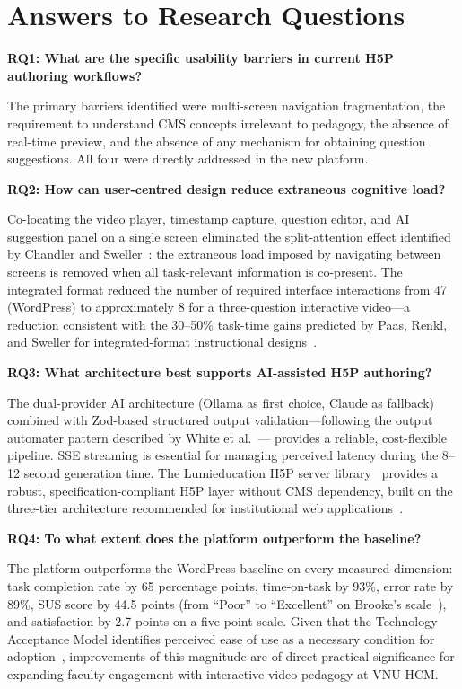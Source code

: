 \section{Answers to Research Questions}

\textbf{RQ1: What are the specific usability barriers in current H5P
authoring workflows?}

The primary barriers identified were multi-screen navigation fragmentation,
the requirement to understand CMS concepts irrelevant to pedagogy, the
absence of real-time preview, and the absence of any mechanism for obtaining
question suggestions. All four were directly addressed in the new platform.

\textbf{RQ2: How can user-centred design reduce extraneous cognitive load?}

Co-locating the video player, timestamp capture, question editor, and AI
suggestion panel on a single screen eliminated the split-attention effect
identified by Chandler and Sweller~\cite{chandler1991}: the extraneous load
imposed by navigating between screens is removed when all task-relevant
information is co-present. The integrated format reduced the number of
required interface interactions from 47 (WordPress) to approximately 8 for
a three-question interactive video---a reduction consistent with the 30--50\%
task-time gains predicted by Paas, Renkl, and Sweller for integrated-format
instructional designs~\cite{paas2003}.

\textbf{RQ3: What architecture best supports AI-assisted H5P authoring?}

The dual-provider AI architecture (Ollama as first choice, Claude as
fallback) combined with Zod-based structured output validation---following
the output automater pattern described by White et al.~\cite{white2023}---
provides a reliable, cost-flexible pipeline. SSE streaming is essential for
managing perceived latency during the 8--12 second generation time. The
Lumieducation H5P server library~\cite{lumieducation2023} provides a robust,
specification-compliant H5P layer without CMS dependency, built on the
three-tier architecture recommended for institutional web
applications~\cite{bass2012}.

\textbf{RQ4: To what extent does the platform outperform the baseline?}

The platform outperforms the WordPress baseline on every measured dimension:
task completion rate by 65 percentage points, time-on-task by 93\%, error
rate by 89\%, SUS score by 44.5 points (from ``Poor'' to ``Excellent'' on
Brooke's scale~\cite{brooke1996}), and satisfaction by 2.7 points on a
five-point scale. Given that the Technology Acceptance Model identifies
perceived ease of use as a necessary condition for adoption~\cite{davis1989},
improvements of this magnitude are of direct practical significance for
expanding faculty engagement with interactive video pedagogy at VNU-HCM.

